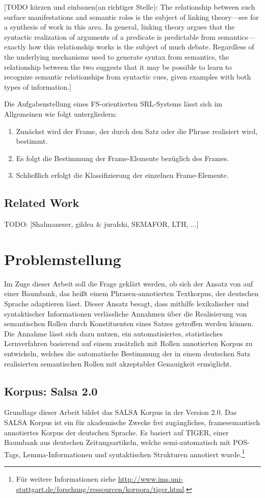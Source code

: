 \documentclass[12pt]{article}
\begin{document}
[TODO kürzen und einbauen(an richtiger Stelle): The relationship between such surface manifestations and
semantic roles is the subject of linking theory—see \cite{levinrappaport}
for a synthesis of work in this area. In general, linking theory argues that the syntactic
realization of arguments of a predicate is predictable from semantics—exactly how this
relationship works is the subject of much debate. Regardless of the underlying mechanisms
used to generate syntax from semantics, the relationship between the two suggests
that it may be possible to learn to recognize semantic relationships from syntactic
cues, given examples with both types of information.]

Die Aufgabenstellung eines FS-orientierten SRL-Systems lässt sich im Allgemeinen
wie folgt untergliedern:
\begin{enumerate}
\item Zunächst wird der Frame, der durch den Satz oder die Phrase realisiert wird, bestimmt.
\item Es folgt die Bestimmung der Frame-Elemente bezüglich des Frames. 
\item Schließlich erfolgt die Klassifizierung der einzelnen Frame-Elemente.
\end{enumerate}

\subsection{Related Work} %

TODO: [Shalmaneser, gildea \& jurafski, SEMAFOR, LTH, ...]

\section{Problemstellung}
Im Zuge dieser Arbeit soll die Frage geklärt werden, ob sich der Ansatz von \cite{gildea} auf einer Baumbank, das heißt einem Phrasen-annotierten Textkorpus, der deutschen Sprache adaptieren lässt. Dieser Ansatz besagt, dass mithilfe lexikalischer und syntaktischer Informationen verlässliche Annahmen über die Realisierung von semantischen Rollen durch Konstituenten eines Satzes getroffen werden können. Die Annahme lässt sich dazu nutzen, ein automatisiertes, statistisches Lernverfahren basierend auf einem zusätzlich mit Rollen annotierten Korpus zu entwickeln, welches die automatische Bestimmung der in einem deutschen Satz realisierten semantischen Rollen mit akzeptabler Genauigkeit ermöglicht.

\subsection{Korpus: Salsa 2.0}
Grundlage dieser Arbeit bildet das SALSA Korpus in der Version 2.0. Das SALSA Korpus ist ein für akademische Zwecke frei zugängliches, framesemantisch annotiertes Korpus der deutschen Sprache. Es basiert auf TIGER\citep{brants_tiger_2002, tiger}, einer Baumbank aus deutschen Zeitungsartikeln, welche semi-automatisch mit POS-Tags, Lemma-Informationen und syntaktischen Strukturen annotiert wurde.\footnote{Für weitere Informationen siehe \url{http://www.ims.uni-stuttgart.de/forschung/ressourcen/korpora/tiger.html}.}
\end{document}
